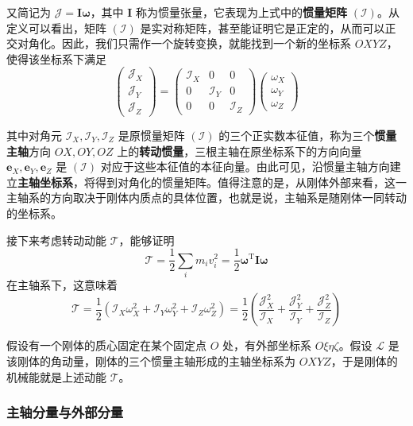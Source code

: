 \documentclass[cn,10pt,math=newtx,citestyle=gb7714-2015,bibstyle=gb7714-2015]{elegantbook}
\def\bm{\boldsymbol}
\def\mbf{\mathbf}
\def\mc{\mathcal}
\def\mr{\mathrm}
\begin{document}
又简记为 $\bm{\mc J}=\mbf I\bm\omega$，其中 $\mbf I$ 称为惯量张量，它表现为上式中的\textbf{惯量矩阵} $(\mc I)$。从定义可以看出，矩阵 $(\mc I)$ 是实对称矩阵，甚至能证明它是正定的，从而可以正交对角化。因此，我们只需作一个旋转变换，就能找到一个新的坐标系 $OXYZ$，使得该坐标系下满足
\begin{equation}
    \begin{pmatrix}
    \mc J_X\\\mc J_Y\\\mc J_Z
    \end{pmatrix}=\begin{pmatrix}
    \mc I_X & 0 & 0\\0 & \mc I_Y & 0\\0 & 0 & \mc I_Z
    \end{pmatrix}\begin{pmatrix}
    \omega_X\\\omega_Y\\\omega_Z
    \end{pmatrix}
\end{equation}

其中对角元 $\mc I_X,\mc I_Y,\mc I_Z$ 是原惯量矩阵 $(\mc I)$ 的三个正实数本征值，称为三个\textbf{惯量主轴}方向 $OX,OY,OZ$ 上的\textbf{转动惯量}，三根主轴在原坐标系下的方向向量 $\bm e_X,\bm e_Y,\bm e_Z$ 是 $(\mc I)$ 对应于这些本征值的本征向量。由此可见，沿惯量主轴方向建立\textbf{主轴坐标系}，将得到对角化的惯量矩阵。值得注意的是，从刚体外部来看，这一主轴系的方向取决于刚体内质点的具体位置，也就是说，主轴系是随刚体一同转动的坐标系。

接下来考虑转动动能 $\mc T$，能够证明
\begin{equation}
    \mc T = \frac 1 2\sum_i m_iv_i^2 = \frac 1 2\bm{\omega}^{\mr T}\mbf I\bm \omega
\end{equation}
在主轴系下，这意味着
\begin{equation}\label{eq:rgd_clsscl_rttn_kntc_enrgy}
    \mc T = \frac 1 2\left(\mc I_X\omega_X^2+\mc I_Y\omega_Y^2+\mc I_Z\omega_Z^2\right) = \frac 1 2\left(\frac{\mc J_X^2}{\mc I_X}+\frac{\mc J_Y^2}{\mc I_Y}+\frac{\mc J_Z^2}{\mc I_Z}\right)
\end{equation}

假设有一个刚体的质心固定在某个固定点 $O$ 处，有外部坐标系 $O\xi\eta\zeta$。假设 $\bm{\mc L}$ 是该刚体的角动量，刚体的三个惯量主轴形成的主轴坐标系为 $OXYZ$，于是刚体的机械能就是上述动能 $\mc T$。

\subsubsection{主轴分量与外部分量}
\end{document}

